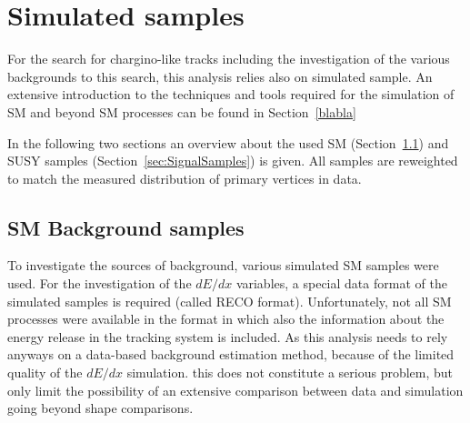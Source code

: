 \section{Simulated samples}
\label{sec:SimulatedSamples}

For the search for chargino-like tracks including the investigation of the various backgrounds to this search, this analysis relies also on simulated sample.
An extensive introduction to the techniques and tools required for the simulation of SM and beyond SM processes can be found in Section~\ref{blabla}

In the following two sections an overview about the used SM (Section~\ref{sec:SMSamples}) and SUSY samples (Section~\ref{sec:SignalSamples}) is given.
All samples are reweighted to match the measured distribution of primary vertices in data.

\subsection{SM Background samples}
\label{sec:SMSamples}
To investigate the sources of background, various simulated SM samples were used.
For the investigation of the $dE/dx$ variables, a special data format of the simulated samples is required (called RECO format).
Unfortunately, not all SM processes were available in the format in which also the information about the energy release in the tracking system is included.
As this analysis needs to rely anyways on a data-based background estimation method, because of the limited quality of the $dE/dx$ simulation.
this does not constitute a serious problem, but only limit the possibility of an extensive comparison between data and simulation going beyond shape comparisons.

